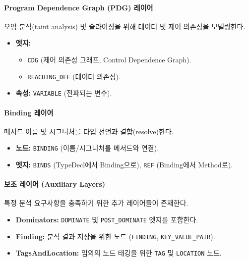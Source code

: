 \paragraph{Program Dependence Graph (PDG) 레이어} 오염 분석(taint analysis) 및 슬라이싱을 위해 데이터 및 제어 의존성을 모델링한다.
\begin{itemize} \setlength{\itemsep}{0pt} \setlength{\parskip}{0pt} \setlength{\topsep}{0pt} \setlength{\partopsep}{0pt}
    \item \textbf{엣지:} 
    \begin{itemize} \setlength{\itemsep}{0pt} \setlength{\parskip}{0pt} \setlength{\topsep}{0pt} \setlength{\partopsep}{0pt}
        \item \texttt{CDG} (제어 의존성 그래프, Control Dependence Graph).
        \item \texttt{REACHING\_DEF} (데이터 의존성).
    \end{itemize}
    \item \textbf{속성:} \texttt{VARIABLE} (전파되는 변수).
\end{itemize}

\paragraph{Binding 레이어} 메서드 이름 및 시그니처를 타입 선언과 결합(resolve)한다.
\begin{itemize} \setlength{\itemsep}{0pt} \setlength{\parskip}{0pt} \setlength{\topsep}{0pt} \setlength{\partopsep}{0pt}
    \item \textbf{노드:} \texttt{BINDING} (이름/시그니처를 메서드와 연결).
    \item \textbf{엣지:} \texttt{BINDS} (TypeDecl에서 Binding으로), \texttt{REF} (Binding에서 Method로).
\end{itemize}

\paragraph{보조 레이어 (Auxiliary Layers)} 특정 분석 요구사항을 충족하기 위한 추가 레이어들이 존재한다.
\begin{itemize} \setlength{\itemsep}{0pt} \setlength{\parskip}{0pt} \setlength{\topsep}{0pt} \setlength{\partopsep}{0pt}
    \item \textbf{Dominators:} \texttt{DOMINATE} 및 \texttt{POST\_DOMINATE} 엣지를 포함한다.
    \item \textbf{Finding:} 분석 결과 저장을 위한 노드 (\texttt{FINDING}, \texttt{KEY\_VALUE\_PAIR}).
    \item \textbf{TagsAndLocation:} 임의의 노드 태깅을 위한 \texttt{TAG} 및 \texttt{LOCATION} 노드.
\end{itemize}

